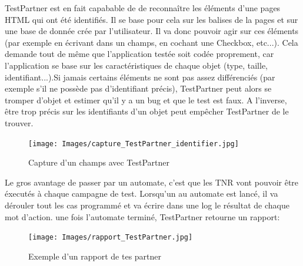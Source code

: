 TestPartner est en fait capabable de de reconnaître les éléments d'une pages HTML qui ont été identifiés. Il se base pour cela sur les balises de la pages et sur une base de donnée crée par l'utilisateur. Il va donc pouvoir agir sur ces éléments (par exemple en écrivant dans un champs, en cochant une Checkbox, etc...). Cela demande tout de même que l'application testée soit codée proprement, car l'application se base sur les caractéristiques de chaque objet (type, taille, identifiant...).Si jamais certains éléments ne sont pas assez différenciés (par exemple s'il ne possède pas d'identifiant précis), TestPartner peut alors se tromper d'objet et estimer qu'il y a un bug et que le test est faux. A l'inverse, être trop précis sur les identifiants d'un objet peut empêcher TestPartner de le trouver. 
\clearpage
\begin{figure}[h]
  \begin{center}
    \texttt{[image: Images/capture\_TestPartner\_identifier.jpg]}
    \caption{Capture d'un champs avec TestPartner}
    \label{Capture d'un champs avec TestPartner}
  \end{center}
\end{figure}


Le gros avantage de passer par un automate, c'est que les TNR vont pouvoir être éxecutés à chaque campagne de test. 
Lorsqu'un au automate est lancé, il va dérouler tout les cas programmé et va écrire dans une log le résultat de chaque mot d'action. une fois l'automate terminé, TestPartner retourne un rapport: 


\begin{figure}[h]
  \begin{center}
    \texttt{[image: Images/rapport\_TestPartner.jpg]}
    \caption{Exemple d'un rapport de tes partner}
    \label{Exemple d'un rapport de tes partner}
  \end{center}
\end{figure}


